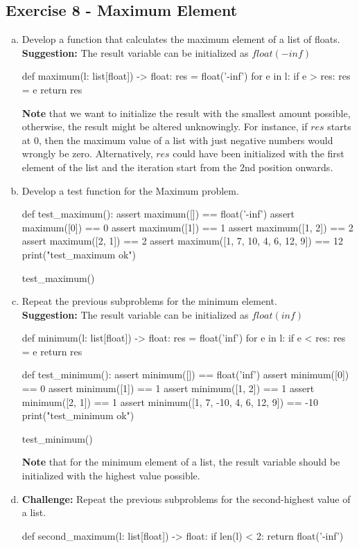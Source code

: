 \documentclass[12pt]{article}
\begin{document}
\subsection*{Exercise 8 - Maximum Element}
\begin{enumerate}[a)]
  \item Develop a function that calculates the maximum element of a list of 
    floats. \\ \textbf{Suggestion:} The result variable can be initialized as 
    $float(-inf)$
  \begin{pythonlst}
def maximum(l: list[float]) -> float:
  res = float('-inf')
  for e in l:
    if e > res:
      res = e
  return res
  \end{pythonlst}
  \vspace{-4mm}
  \textbf{Note} that we want to initialize the result with the smallest amount
  possible, otherwise, the result might be altered unknowingly. For instance,
  if $res$ starts at $0$, then the maximum value of a list with just negative 
  numbers would wrongly be zero. Alternatively, $res$ could have been initialized
  with the first element of the list and the iteration start from the 2nd position
  onwards.
  \item Develop a test function for the Maximum problem.
\begin{pythonlst}
def test_maximum():
  assert maximum([]) == float('-inf')
  assert maximum([0]) == 0
  assert maximum([1]) == 1
  assert maximum([1, 2]) == 2
  assert maximum([2, 1]) == 2
  assert maximum([1, 7, 10, 4, 6, 12, 9]) == 12
  print("test_maximum ok")

test_maximum()
\end{pythonlst}
  \item Repeat the previous subproblems for the minimum element. \\
    \textbf{Suggestion:} The result variable can be initialized as $float(inf)$
\begin{pythonlst}
def minimum(l: list[float]) -> float:
  res = float('inf')
  for e in l:
    if e < res:
      res = e
  return res

def test_minimum():
  assert minimum([]) == float('inf')
  assert minimum([0]) == 0
  assert minimum([1]) == 1
  assert minimum([1, 2]) == 1
  assert minimum([2, 1]) == 1
  assert minimum([1, 7, -10, 4, 6, 12, 9]) == -10
  print("test_minimum ok")

test_minimum()
\end{pythonlst}
\textbf{Note} that for the minimum element of a list, the result variable should
be initialized with the highest value possible.
  \item \textbf{Challenge:} Repeat the previous subproblems for the second-highest
    value of a list.
\begin{pythonlst}
def second_maximum(l: list[float]) -> float:
  if len(l) < 2:
    return float('-inf')
  

\end{pythonlst}
\end{enumerate}
\end{document}
